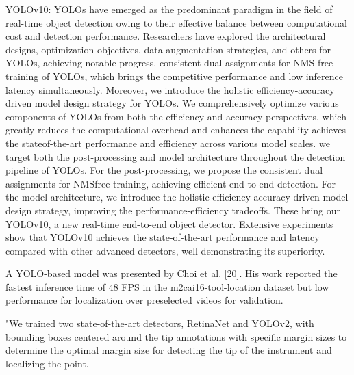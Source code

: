 YOLOv10: YOLOs have emerged as the predominant paradigm in the field of real-time object detection owing to their effective balance between computational cost and detection performance. Researchers have explored the architectural designs, optimization objectives, data augmentation strategies, and others for YOLOs, achieving notable progress. consistent dual assignments for NMS-free training of YOLOs, which brings the competitive performance and low inference latency simultaneously. Moreover, we introduce the holistic efficiency-accuracy driven model design strategy for YOLOs. We comprehensively optimize various components of YOLOs from both the efficiency and accuracy perspectives, which greatly reduces the computational overhead and enhances the capability achieves the stateof-the-art performance and efficiency across various model scales.
we target both the post-processing and model architecture throughout the detection pipeline of YOLOs. For the post-processing, we propose the consistent dual assignments for NMSfree training, achieving efficient end-to-end detection. For the model architecture, we introduce the holistic efficiency-accuracy driven model design strategy, improving the performance-efficiency tradeoffs. These bring our YOLOv10, a new real-time end-to-end object detector. Extensive experiments show that YOLOv10 achieves the state-of-the-art performance and latency compared with other advanced detectors, well demonstrating its superiority. 

A YOLO-based model was presented by Choi et al. [20]. His work reported the fastest inference time of 48 FPS in the m2cai16-tool-location dataset but low performance for localization over preselected videos for validation. 

"We trained two state-of-the-art detectors, RetinaNet and YOLOv2, with bounding boxes centered around the tip annotations with specific margin sizes to determine the optimal margin size for detecting the tip of the instrument and localizing the point. 

